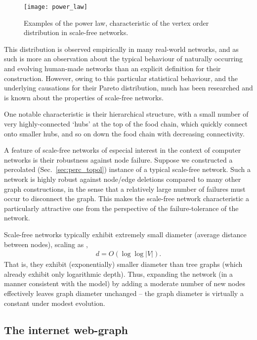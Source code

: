 \begin{figure}[!htbp]
\texttt{[image: power\_law]}
\caption{Examples of the power law, characteristic of the vertex order distribution in scale-free networks.}\label{fig:power_law}	
\end{figure}

This distribution is observed empirically in many real-world networks, and as such is more an observation about the typical behaviour of naturally occurring and evolving human-made networks than an explicit definition for their construction. However, owing to this particular statistical behaviour, and the underlying causations for their Pareto distribution, much has been researched and is known about the properties of scale-free networks.

One notable characteristic is their hierarchical structure, with a small number of very highly-connected `hubs' at the top of the food chain, which quickly connect onto smaller hubs, and so on down the food chain with decreasing connectivity.

A feature of scale-free networks of especial interest in the context of computer networks is their robustness against node failure. Suppose we constructed a percolated (Sec.~\ref{sec:perc_topol}) instance of a typical scale-free network. Such a network is highly robust against node/edge deletions compared to many other graph constructions, in the sense that a relatively large number of failures must occur to disconnect the graph. This makes the scale-free network characteristic a particularly attractive one from the perspective of the failure-tolerance of the network.

Scale-free networks typically exhibit extremely small diameter (average distance between nodes), scaling as \cite{bib:PhysRevLett.90.058701},
\begin{align}
	d = O(\log \log |V|).
\end{align}
That is, they exhibit (exponentially) smaller diameter than tree graphs (which already exhibit only logarithmic depth). Thus, expanding the network (in a manner consistent with the model) by adding a moderate number of new nodes effectively leaves graph diameter unchanged -- the graph diameter is virtually a constant under modest evolution.

%
%

\subsection{The internet web-graph} 

